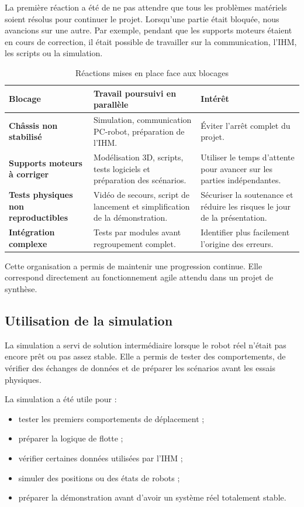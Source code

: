 \documentclass[11pt,a4paper]{report}
\begin{document}
La première réaction a été de ne pas attendre que tous les problèmes matériels soient résolus pour continuer le projet. Lorsqu'une partie était bloquée, nous avancions sur une autre. Par exemple, pendant que les supports moteurs étaient en cours de correction, il était possible de travailler sur la communication, l'IHM, les scripts ou la simulation.

\begin{table}[H]
\centering
\small
\renewcommand{\arraystretch}{1.25}
\begin{tabular}{|p{4cm}|p{5.5cm}|p{5.2cm}|}
\hline
\textbf{Blocage} & \textbf{Travail poursuivi en parallèle} & \textbf{Intérêt} \\
\hline
\textbf{Châssis non stabilisé} &
Simulation, communication PC-robot, préparation de l'IHM. &
Éviter l'arrêt complet du projet. \\
\hline
\textbf{Supports moteurs à corriger} &
Modélisation 3D, scripts, tests logiciels et préparation des scénarios. &
Utiliser le temps d'attente pour avancer sur les parties indépendantes. \\
\hline
\textbf{Tests physiques non reproductibles} &
Vidéo de secours, script de lancement et simplification de la démonstration. &
Sécuriser la soutenance et réduire les risques le jour de la présentation. \\
\hline
\textbf{Intégration complexe} &
Tests par modules avant regroupement complet. &
Identifier plus facilement l'origine des erreurs. \\
\hline
\end{tabular}
\caption{Réactions mises en place face aux blocages}
\label{tab:reactions_blocages}
\end{table}

Cette organisation a permis de maintenir une progression continue. Elle correspond directement au fonctionnement agile attendu dans un projet de synthèse.

\subsection{Utilisation de la simulation}

La simulation a servi de solution intermédiaire lorsque le robot réel n'était pas encore prêt ou pas assez stable. Elle a permis de tester des comportements, de vérifier des échanges de données et de préparer les scénarios avant les essais physiques.

La simulation a été utile pour :
\begin{itemize}
    \item tester les premiers comportements de déplacement ;
    \item préparer la logique de flotte ;
    \item vérifier certaines données utilisées par l'IHM ;
    \item simuler des positions ou des états de robots ;
    \item préparer la démonstration avant d'avoir un système réel totalement stable.
\end{itemize}
\end{document}
